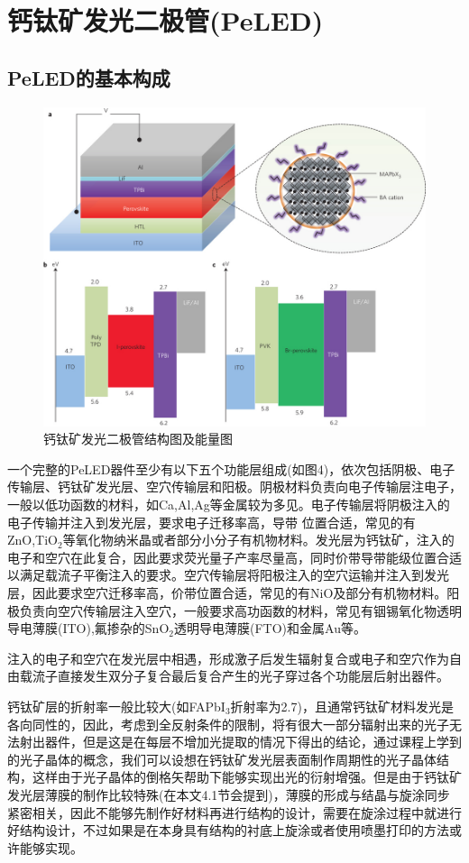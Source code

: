 \documentclass{phyasgn}\usepackage{nag}
\begin{document}
\section{钙钛矿发光二极管(PeLED)}
\subsection{PeLED的基本构成}
	\begin{figure}[H]
		\centering
		\hspace{2em}\includegraphics[width=.7\linewidth]{pic/6.jpg}
		\caption{钙钛矿发光二极管结构图及能量图
		}
	\end{figure}
\par  一个完整的PeLED器件至少有以下五个功能层组成(如图4)，依次包括阴极、电子传输层、钙钛矿发光层、空穴传输层和阳极。阴极材料负责向电子传输层注电子，一般以低功函数的材料，如Ca,Al,Ag等金属较为多见。电子传输层将阴极注入的电子传输并注入到发光层，要求电子迁移率高，导带 位置合适，常见的有ZnO,TiO$_{2}$等氧化物纳米晶或者部分小分子有机物材料。发光层为钙钛矿，注入的电子和空穴在此复合，因此要求荧光量子产率尽量高，同时价带导带能级位置合适以满足载流子平衡注入的要求。空穴传输层将阳极注入的空穴运输并注入到发光层，因此要求空穴迁移率高，价带位置合适，常见的有NiO及部分有机物材料。阳极负责向空穴传输层注入空穴，一般要求高功函数的材料，常见有铟锡氧化物透明导电薄膜(ITO),氟掺杂的SnO$_{2}$透明导电薄膜(FTO)和金属Au等。
\par 注入的电子和空穴在发光层中相遇，形成激子后发生辐射复合或电子和空穴作为自由载流子直接发生双分子复合最后复合产生的光子穿过各个功能层后射出器件。
\par 钙钛矿层的折射率一般比较大(如FAPbI$_{3}$折射率为2.7)，且通常钙钛矿材料发光是各向同性的，因此，考虑到全反射条件的限制，将有很大一部分辐射出来的光子无法射出器件，但是这是在每层不增加光提取的情况下得出的结论，通过课程上学到的光子晶体的概念，我们可以设想在钙钛矿发光层表面制作周期性的光子晶体结构，这样由于光子晶体的倒格矢帮助下能够实现出光的衍射增强。但是由于钙钛矿发光层薄膜的制作比较特殊(在本文4.1节会提到)，薄膜的形成与结晶与旋涂同步紧密相关，因此不能够先制作好材料再进行结构的设计，需要在旋涂过程中就进行好结构设计，不过如果是在本身具有结构的衬底上旋涂或者使用喷墨打印的方法或许能够实现。
\end{document}
